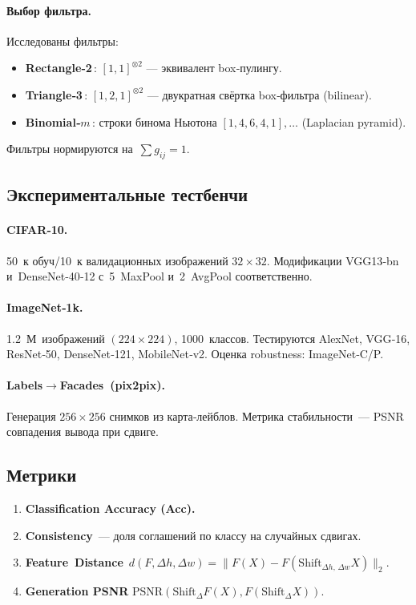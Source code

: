 \paragraph{Выбор фильтра.} Исследованы фильтры:
\begin{itemize}
  \item\textbf{Rectangle‑2}\,: $[1,1]^{\otimes2}$ — эквивалент box‑пулингу.
  \item\textbf{Triangle‑3}\,: $[1,2,1]^{\otimes2}$ — двукратная свёртка box‑фильтра (bilinear).
  \item\textbf{Binomial‑$m$}\,: строки бинома Ньютона $[1,4,6,4,1], \dots$ (Laplacian pyramid).
\end{itemize}
Фильтры нормируются на $\sum g_{ij}=1$.

\subsection{Экспериментальные тестбенчи}
\paragraph{CIFAR‑10.} 50 к обуч/10 к валидационных изображений $32\times32$. Модификации VGG13‑bn и DenseNet‑40‑12 с 5 MaxPool и 2 AvgPool соответственно.

\paragraph{ImageNet‑1k.} 1.2 М изображений $(224\times224)$, 1000 классов. Тестируются AlexNet, VGG‑16, ResNet‑50, DenseNet‑121, MobileNet‑v2. Оценка robustness: ImageNet‑C/P.

\paragraph{Labels$\to$Facades~(pix2pix).} Генерация $256\times256$ снимков из карта‑лейблов. Метрика стабильности — PSNR совпадения вывода при сдвиге.

\subsection{Метрики}
\begin{enumerate}
  \item \textbf{Classification Accuracy (Acc).}
  \item \textbf{Consistency} — доля соглашений по классу на случайных сдвигах.
  \item \textbf{Feature Distance} $\,d(F,\Delta h,\Delta w)=\lVert F(X)-F(\mathrm{Shift}_{\Delta h,\,\Delta w}X)\rVert_2$.
  \item \textbf{Generation PSNR} $\mathrm{PSNR}( \mathrm{Shift}_\Delta F(X), F(\mathrm{Shift}_\Delta X) )$.
\end{enumerate}

